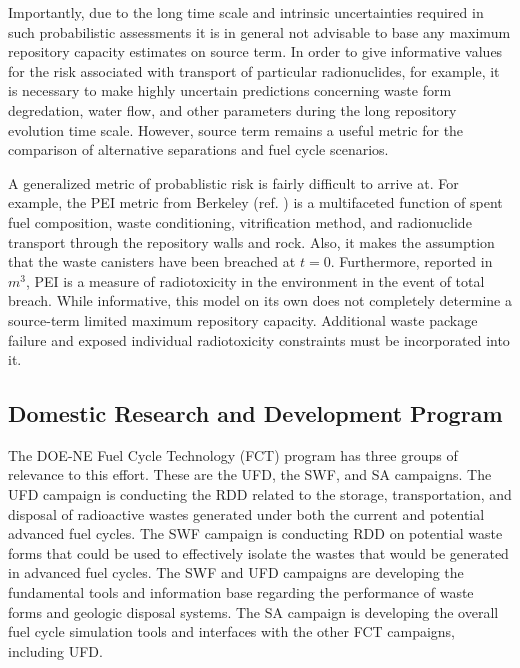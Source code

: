 Importantly, due to the long time scale and intrinsic uncertainties required in 
such probabilistic assessments it is in general not advisable to base any 
maximum repository capacity estimates on source term.
In order to give informative values for the risk associated with transport of 
particular radionuclides, for example, it is necessary to make highly uncertain  
predictions concerning waste form degredation, water flow, and other parameters 
during the long repository evolution time scale.  However, source term remains a 
useful metric for the comparison of alternative separations and fuel cycle 
scenarios.


A generalized metric of probablistic risk is fairly difficult to arrive at. For 
example, the \gls{PEI} metric from Berkeley (ref.  
\cite{bouvier_comparison_2007}) is a multifaceted function of spent fuel 
composition, waste conditioning, vitrification method, and radionuclide 
transport through the repository walls and rock.  Also, it makes the assumption 
that the waste canisters have been breached at $t=0$. Furthermore, reported in 
$m^3$, PEI is a measure of radiotoxicity in the environment in the event of 
total breach. While informative, this model on its own does not completely 
determine a source-term limited maximum repository capacity.  Additional waste 
package failure and exposed individual radiotoxicity constraints must be 
incorporated into it.


\subsection{Domestic Research and Development Program}

The DOE-NE Fuel Cycle Technology (FCT) program has three groups of relevance to 
this effort.  These are the \gls{UFD}, the \gls{SWF}, and \gls{SA} campaigns.  
The \gls{UFD} campaign is conducting the \gls{RDD} related to the storage, 
transportation, and disposal of radioactive wastes generated under both the 
current and potential advanced fuel cycles.  The SWF campaign is conducting 
\gls{RDD} on potential waste forms that could be used to effectively isolate the 
wastes that would be generated in advanced fuel cycles.  The \gls{SWF} and
\gls{UFD} campaigns are developing the fundamental tools and information base 
regarding the performance of waste forms and geologic disposal systems.  The 
\gls{SA} campaign is developing the overall fuel cycle simulation tools and 
interfaces with the other FCT campaigns, including \gls{UFD}.  

